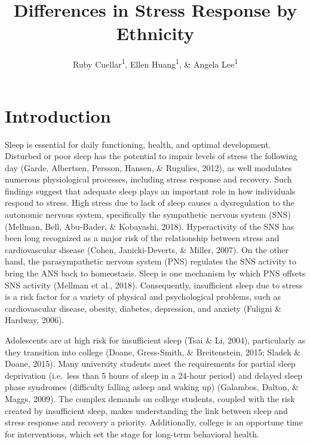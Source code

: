 \documentclass[
  man, fleqn, noextraspace]{apa6}
\affiliation{
\vspace{0.5cm}
\textsuperscript{1} University of Oregon}
\title{Differences in Stress Response by Ethnicity}
\author{Ruby Cuellar\textsuperscript{1}, Ellen Huang\textsuperscript{1}, \& Angela Lee\textsuperscript{1}}
\date{}
\begin{document}
\maketitle

\hypertarget{introduction}{%
\section{Introduction}\label{introduction}}

Sleep is essential for daily functioning, health, and optimal development. Disturbed or poor sleep has the potential to impair levels of stress the following day (Garde, Albertsen, Persson, Hansen, \& Rugulies, 2012), as well modulates numerous physiological processes, including stress response and recovery. Such findings suggest that adequate sleep plays an important role in how individuals respond to stress. High stress due to lack of sleep causes a dysregulation to the autonomic nervous system, specifically the sympathetic nervous system (SNS) (Mellman, Bell, Abu-Bader, \& Kobayashi, 2018). Hyperactivity of the SNS has been long recognized as a major risk of the relationship between stress and cardiovascular disease (Cohen, Janicki-Deverts, \& Miller, 2007). On the other hand, the parasympathetic nervous system (PNS) regulates the SNS activity to bring the ANS back to homeostasis. Sleep is one mechanism by which PNS offsets SNS activity (Mellman et al., 2018). Consequently, insufficient sleep due to stress is a risk factor for a variety of physical and psychological problems, such as cardiovascular disease, obesity, diabetes, depression, and anxiety (Fuligni \& Hardway, 2006).

Adolescents are at high risk for insufficient sleep (Tsai \& Li, 2004), particularly as they transition into college (Doane, Gress-Smith, \& Breitenstein, 2015; Sladek \& Doane, 2015). Many university students meet the requirements for partial sleep deprivation (i.e.~less than 5 hours of sleep in a 24-hour period) and delayed sleep phase syndromes (difficulty falling asleep and waking up) (Galambos, Dalton, \& Maggs, 2009). The complex demands on college students, coupled with the risk created by insufficient sleep, makes understanding the link between sleep and stress response and recovery a priority. Additionally, college is an opportune time for interventions, which set the stage for long-term behavioral health.
\end{document}
